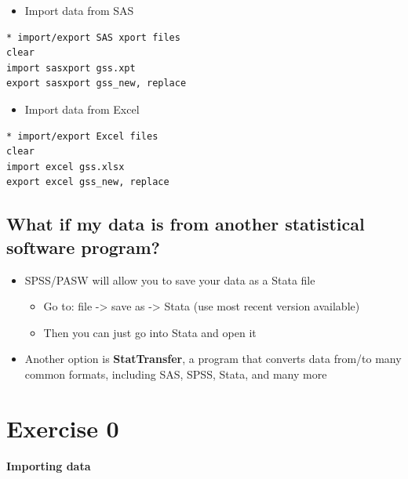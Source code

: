 \documentclass[]{book}
\providecommand{\tightlist}{%
  \setlength{\itemsep}{0pt}\setlength{\parskip}{0pt}}
\begin{document}
\begin{itemize}
\tightlist
\item
  Import data from SAS
\end{itemize}

\begin{verbatim}
* import/export SAS xport files
clear
import sasxport gss.xpt
export sasxport gss_new, replace
\end{verbatim}

\begin{itemize}
\tightlist
\item
  Import data from Excel
\end{itemize}

\begin{verbatim}
* import/export Excel files
clear
import excel gss.xlsx
export excel gss_new, replace
\end{verbatim}

\subsection{What if my data is from another statistical software
program?}\label{what-if-my-data-is-from-another-statistical-software-program}

\begin{itemize}
\tightlist
\item
  SPSS/PASW will allow you to save your data as a Stata file

  \begin{itemize}
  \tightlist
  \item
    Go to: file -\textgreater{} save as -\textgreater{} Stata (use most
    recent version available)
  \item
    Then you can just go into Stata and open it
  \end{itemize}
\item
  Another option is \textbf{StatTransfer}, a program that converts data
  from/to many common formats, including SAS, SPSS, Stata, and many more
\end{itemize}

\section{Exercise 0}\label{exercise-0-6}

\textbf{Importing data}
\end{document}
